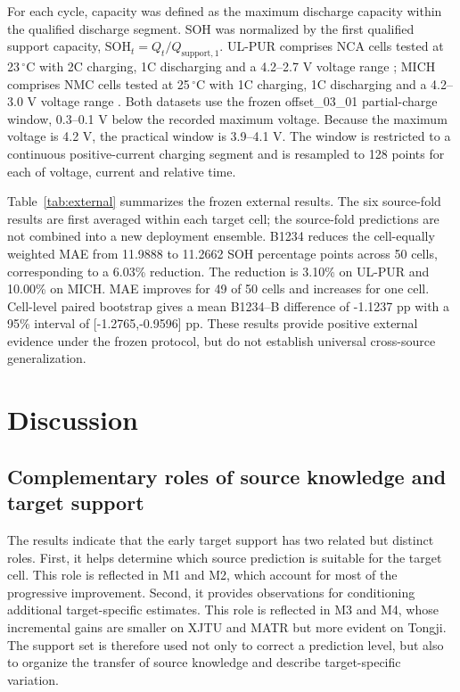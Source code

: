 \documentclass[preprint,12pt]{elsarticle}
\begin{document}
For each cycle, capacity was defined as the maximum discharge capacity within the qualified discharge segment. SOH was normalized by the first qualified support capacity, $\mathrm{SOH}_t=Q_t/Q_{\mathrm{support},1}$. UL-PUR comprises NCA cells tested at 23\,$^{\circ}$C with 2C charging, 1C discharging and a 4.2--2.7 V voltage range \citep{ulpur2020}; MICH comprises NMC cells tested at 25\,$^{\circ}$C with 1C charging, 1C discharging and a 4.2--3.0 V voltage range \citep{mich2021}. Both datasets use the frozen offset\_03\_01 partial-charge window, 0.3--0.1 V below the recorded maximum voltage. Because the maximum voltage is 4.2 V, the practical window is 3.9--4.1 V. The window is restricted to a continuous positive-current charging segment and is resampled to 128 points for each of voltage, current and relative time.

Table~\ref{tab:external} summarizes the frozen external results. The six source-fold results are first averaged within each target cell; the source-fold predictions are not combined into a new deployment ensemble. B1234 reduces the cell-equally weighted MAE from 11.9888 to 11.2662 SOH percentage points across 50 cells, corresponding to a 6.03\% reduction. The reduction is 3.10\% on UL-PUR and 10.00\% on MICH. MAE improves for 49 of 50 cells and increases for one cell. Cell-level paired bootstrap gives a mean B1234--B difference of -1.1237 pp with a 95\% interval of [-1.2765,-0.9596] pp. These results provide positive external evidence under the frozen protocol, but do not establish universal cross-source generalization.



\section{Discussion}
\label{sec:discussion}
\subsection{Complementary roles of source knowledge and target support}
The results indicate that the early target support has two related but distinct roles. First, it helps determine which source prediction is suitable for the target cell. This role is reflected in M1 and M2, which account for most of the progressive improvement. Second, it provides observations for conditioning additional target-specific estimates. This role is reflected in M3 and M4, whose incremental gains are smaller on XJTU and MATR but more evident on Tongji. The support set is therefore used not only to correct a prediction level, but also to organize the transfer of source knowledge and describe target-specific variation.
\end{document}
